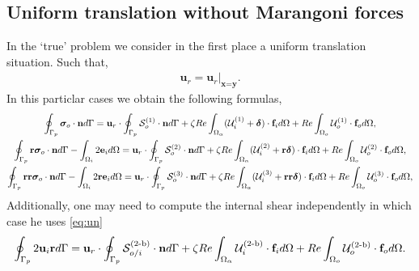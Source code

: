\subsection{Uniform translation without Marangoni forces}
In the `true' problem we consider in the first place a uniform translation situation.
Such that, 
\begin{align*}
    \textbf{u}_r = \textbf{u}_r|_{\textbf{x}=\textbf{y}} . 
\end{align*}
In this particlar cases we obtain the following formulas,
\begin{multline}
    \intS[p]{\bm\sigma_{o}\cdot \textbf{n}}
    =
    \textbf{u}_{r}\cdot\intS[p]{ \mathcal{S}_o^{(1)} \cdot \textbf{n}}
    + \zeta Re \intO{(\mathcal{U}_{i}^{(1)} + \bm\delta)\cdot \textbf{f}_{i}} 
    + Re\intO[o]{\mathcal{U}_{o}^{(1)}\cdot \textbf{f}_{o}},\\
    \intS[p]{\textbf{r}  \bm\sigma_{o}\cdot \textbf{n}}
    - \intO[i]{2\textbf{e}_i}
    =
    \textbf{u}_{r}\cdot\intS[p]{  \mathcal{S}_o^{(2)}\cdot \textbf{n}}
    + \zeta Re \intO{(\mathcal{U}_{i}^{(2)}  + \textbf{r}\bm\delta)\cdot \textbf{f}_{i}} 
    + Re\intO[o]{\mathcal{U}_{o}^{(2)}\cdot \textbf{f}_{o}},\\
    \intS[p]{\textbf{rr}  \bm\sigma_{o}\cdot \textbf{n}}
    - \intO[i]{2\textbf{re}_i}
    =
    \textbf{u}_{r}\cdot\intS[p]{ \mathcal{S}_o^{(3)}\cdot \textbf{n}}
    + \zeta Re \intO{(\mathcal{U}_{i}^{(3)} + \textbf{rr}\bm\delta)\cdot \textbf{f}_{i}} 
    + Re\intO[o]{\mathcal{U}_{o}^{(3)} \cdot \textbf{f}_{o}},
\end{multline}
Additionally, one may need to compute the internal shear independently in which case he uses \ref{eq:un} 
\begin{equation}
    \intS[p]{2\textbf{u}_{i} \textbf{r}}
    =
    \textbf{u}_{r}\cdot \intS[p]{ \mathcal{S}^\text{(2-b)}_{o/i} \cdot \textbf{n}}
    + \zeta Re \intO{\mathcal{U}^\text{(2-b)}_{i} \cdot \textbf{f}_{i}} 
    + Re\intO[o]{\mathcal{U}^\text{(2-b)}_{o}\cdot \textbf{f}_{o}}.
\end{equation}
